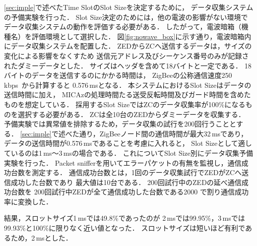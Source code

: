 \documentclass[technicalreport]{ieicej}
\begin{document}
\ref{sec:imple}で述べたTime SlotのSlot Sizeを決定するために，
データ収集システムの予備実験を行った．
Slot Size決定のためには，他の電波の影響がない環境で
データ収集システムの動作を評価する必要がある．
したがって，電波暗箱（機種名）を評価環境として選択した．
図\ref{fig:nowave_box}に示す通り，電波暗箱内にデータ収集システムを配置した．
ZEDからZCへ送信するデータは，サイズの変化による影響をなくすため
送信元アドレス及びシーケンス番号のみが記録されたダミーデータとした．
サイズはヘッダを含めて18バイトと一定である．
18バイトのデータを送信するのにかかる時間は，
ZigBeeの公称通信速度250\,kbps~\cite{ZigBee04:}から計算すると
0.576\,msとなる．
本システムにおけるSlot Sizeはデータの送信時間に加え，
MICAzの処理時間たる送受反転時間及びガード時間を含めたものを想定している．
採用するSlot SizeではZCのデータ収集率が100\%になるものを選択する必要がある．
ZCは全10台のZEDからダミーデータを収集する．
予備実験では異常値を排除するため，データ収集の試行を200回行うこととする．
\ref{sec:imple}で述べた通り，ZigBeeノード間の通信時間が最大32\,msであり，
データの送信時間が0.576\,msであることを考慮に入れると，
Slot Sizeとして適しているのは1\,ms〜3\,msの場合である．
これについてSlot Size別にデータ収集予備実験を行った．
Packet snifferを用いてエラーパケットの有無を監視し，通信成功台数を測定する．
通信成功台数とは，1回のデータ収集試行でZEDがZCへ送信成功した台数であり
最大値は10台である．
200回試行中のZEDの延べ通信成功台数を
200回試行中ZEDが全て通信成功した台数である2000
で割り通信成功率に変換した．


結果，スロットサイズ1\,msでは49.8\%であったのが
2\,msでは99.95\%，3\,msでは99.93\%と100\%に限りなく近い値となった．
スロットサイズは短いほど有利であるため，2\,msとした．
\end{document}
